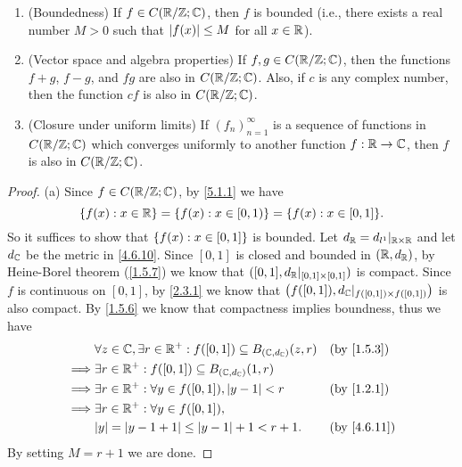 \begin{lem}\label{5.1.5}
  \quad
  \begin{enumerate}
    \item (Boundedness)
          If \(f \in C(\mathbb{R} / \mathbb{Z} ; \mathbb{C})\), then \(f\) is bounded
          (i.e., there exists a real number \(M > 0\) such that \(\left\lvert f(x)\right\rvert \leq M\) for all \(x \in \mathbb{R}\)).
    \item (Vector space and algebra properties)
          If \(f, g \in C(\mathbb{R} / \mathbb{Z} ; \mathbb{C})\), then the functions \(f + g\), \(f - g\), and \(f g\) are also in \(C(\mathbb{R} / \mathbb{Z} ; \mathbb{C})\).
          Also, if \(c\) is any complex number, then the function \(cf\) is also in \(C(\mathbb{R} / \mathbb{Z} ; \mathbb{C})\).
    \item (Closure under uniform limits)
          If \((f_n)_{n = 1}^\infty\) is a sequence of functions in \(C(\mathbb{R} / \mathbb{Z} ; \mathbb{C})\) which converges uniformly to another function \(f : \mathbb{R} \to \mathbb{C}\), then \(f\) is also in \(C(\mathbb{R} / \mathbb{Z} ; \mathbb{C})\).
  \end{enumerate}
\end{lem}

\begin{proof}{(a)}
  Since \(f \in C(\mathbb{R} / \mathbb{Z} ; \mathbb{C})\), by \cref{5.1.1} we have
  \[
    \set{f(x) : x \in \R} = \set{f(x) : x \in [0, 1)} = \set{f(x) : x \in [0, 1]}.
  \]
  So it suffices to show that \(\left\lbrace f(x) : x \in [0, 1]\right\rbrace\) is bounded.
  Let \(d_{\mathbb{R}} = d_{l^1}|_{\mathbb{R} \times \mathbb{R}}\) and let \(d_{\mathbb{C}}\) be the metric in \cref{4.6.10}.
  Since \([0, 1]\) is closed and bounded in \((\mathbb{R}, d_{\mathbb{R}})\), by Heine-Borel theorem (\cref{1.5.7}) we know that \(([0, 1], d_{\mathbb{R}}|_{[0, 1] \times [0, 1]})\) is compact.
  Since \(f\) is continuous on \([0, 1]\), by \cref{2.3.1} we know that \(\big(f([0, 1]), d_{\mathbb{C}}|_{f([0, 1]) \times f([0, 1])}\big)\) is also compact.
  By \cref{1.5.6} we know that compactness implies boundness, thus we have
  \begin{align*}
             & \forall z \in \C, \exists r \in \R^+ : f([0, 1]) \subseteq B_{(\C, d_{\C})}(z, r) &  & \by{1.5.3}  \\
    \implies & \exists r \in \R^+ : f([0, 1]) \subseteq B_{(\C, d_{\C})}(1, r)                                    \\
    \implies & \exists r \in \R^+ : \forall y \in f([0, 1]), \abs{y - 1} < r                     &  & \by{1.2.1}  \\
    \implies & \exists r \in \R^+ : \forall y \in f([0, 1]),                                                      \\
             & \abs{y} = \abs{y - 1 + 1} \leq \abs{y - 1} + 1 < r + 1.                           &  & \by{4.6.11}
  \end{align*}
  By setting \(M = r + 1\) we are done.
\end{proof}

